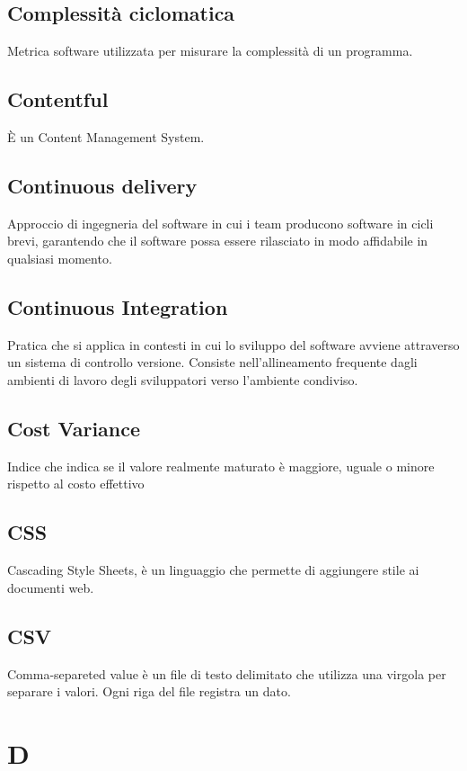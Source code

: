 \subsection*{Complessità ciclomatica}
Metrica software utilizzata per misurare la complessità di un programma.

\subsection*{Contentful}
È un Content Management System.

\subsection*{Continuous delivery}
Approccio di ingegneria del software in cui i team producono software in cicli brevi, garantendo che il software possa essere rilasciato in modo affidabile in qualsiasi momento.

\subsection*{Continuous Integration}
Pratica che si applica in contesti in cui lo sviluppo del software avviene attraverso un sistema di controllo versione. Consiste nell'allineamento frequente dagli ambienti di lavoro degli sviluppatori verso l'ambiente condiviso.

\subsection*{Cost Variance}
Indice che indica se il valore realmente maturato è maggiore, uguale o minore rispetto al costo effettivo

\subsection*{CSS}
Cascading Style Sheets, è un linguaggio che permette di aggiungere stile ai documenti web.

\subsection*{CSV}
Comma-separeted value è un file di testo delimitato che utilizza una virgola per separare i valori. Ogni riga del file registra un dato.

\newpage
\section{D}
